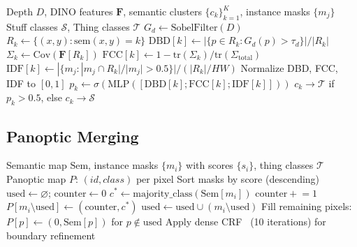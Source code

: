 \documentclass[10pt,twocolumn,letterpaper]{article}
\begin{document}
\begin{algorithm}[H]
\caption{MC-STC: Multi-Cue Stuff-Things Classifier}
\label{alg:stc}
\begin{algorithmic}[1]
\REQUIRE Depth $D$, DINO features $\mathbf{F}$, semantic clusters $\{c_k\}_{k=1}^K$, instance masks $\{m_j\}$
\ENSURE Stuff classes $\mathcal{S}$, Thing classes $\mathcal{T}$
\STATE $G_d \leftarrow \text{SobelFilter}(D)$ 
    \STATE $R_k \leftarrow \{(x,y) : \text{sem}(x,y) = k\}$
    \STATE $\text{DBD}[k] \leftarrow |\{p \in R_k : G_d(p) > \tau_d\}| / |R_k|$ 
    \STATE $\Sigma_k \leftarrow \text{Cov}(\mathbf{F}[R_k])$
    \STATE $\text{FCC}[k] \leftarrow 1 - \text{tr}(\Sigma_k) / \text{tr}(\Sigma_{\text{total}})$ 
    \STATE $\text{IDF}[k] \leftarrow |\{m_j : |m_j \cap R_k|/|m_j| > 0.5\}| / (|R_k|/HW)$ 
\ENDFOR
\STATE Normalize DBD, FCC, IDF to $[0, 1]$
    \STATE $p_k \leftarrow \sigma(\text{MLP}([\text{DBD}[k]; \text{FCC}[k]; \text{IDF}[k]]))$
    \STATE $c_k \to \mathcal{T}$ if $p_k > 0.5$, else $c_k \to \mathcal{S}$
\ENDFOR
\end{algorithmic}
\end{algorithm}


\subsection{Panoptic Merging}
\label{sec:supp_merge}

\begin{algorithm}[H]
\caption{Panoptic Merging}
\label{alg:merge}
\begin{algorithmic}[1]
\REQUIRE Semantic map $\text{Sem}$, instance masks $\{m_i\}$ with scores $\{s_i\}$, thing classes $\mathcal{T}$
\ENSURE Panoptic map $P$: $(id, class)$ per pixel
\STATE Sort masks by score (descending)
\STATE $\text{used} \leftarrow \varnothing$; $\text{counter} \leftarrow 0$
    \STATE $c^* \leftarrow \text{majority\_class}(\text{Sem}[m_i])$
        \STATE $\text{counter} \mathrel{+}= 1$
        \STATE $P[m_i \setminus \text{used}] \leftarrow (\text{counter}, c^*)$
        \STATE $\text{used} \leftarrow \text{used} \cup (m_i \setminus \text{used})$
    \ENDIF
\ENDFOR
\STATE Fill remaining pixels: $P[p] \leftarrow (0, \text{Sem}[p])$ for $p \notin \text{used}$
\STATE Apply dense CRF~\cite{krahenbuhl2011crf} (10 iterations) for boundary refinement
\end{algorithmic}
\end{algorithm}
\end{document}
